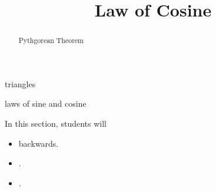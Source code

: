 \documentclass{ximera}
\title{Law of Cosine}
\begin{document}
\begin{abstract}
Pythgorean Theorem
\end{abstract}
\maketitle





triangles

laws of sine and cosine










\begin{sectionOutcomes}
In this section, students will 

\begin{itemize}
\item backwards.
\item .
\item .
\end{itemize}
\end{sectionOutcomes}
\end{document}
